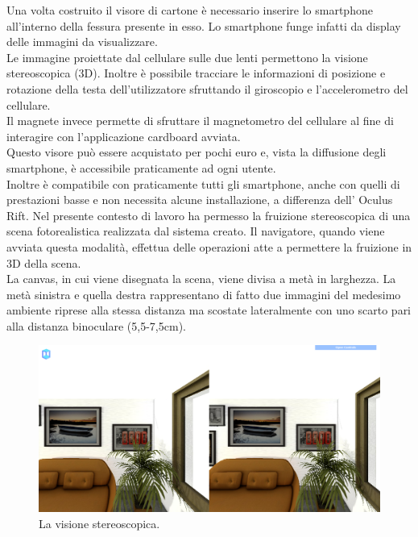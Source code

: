 Una volta costruito il visore di cartone è necessario inserire lo smartphone all’interno della fessura presente in esso. Lo smartphone funge infatti da display delle immagini da visualizzare.
\\
Le immagine proiettate dal cellulare sulle due lenti permettono la visione stereoscopica (3D).
Inoltre è possibile tracciare le informazioni di posizione e rotazione della testa dell’utilizzatore sfruttando il giroscopio e l’accelerometro del cellulare. 
\\
Il magnete invece permette di sfruttare il magnetometro del cellulare al fine di interagire con l’applicazione cardboard avviata.
\\
Questo visore può essere acquistato per pochi euro e, vista la diffusione degli smartphone, è accessibile praticamente ad ogni utente. 
\\
Inoltre è compatibile con praticamente tutti gli smartphone, anche con quelli di prestazioni basse e non necessita alcune installazione, a differenza dell’ Oculus Rift.
Nel presente contesto di lavoro ha permesso la fruizione stereoscopica di una scena fotorealistica realizzata dal sistema creato.
Il navigatore, quando viene avviata questa modalità, effettua delle operazioni atte a permettere la fruizione in 3D della scena. 
\\
La canvas, in cui viene disegnata la scena, viene divisa a metà in larghezza. La metà sinistra e  quella destra rappresentano di fatto due immagini del medesimo ambiente riprese alla stessa distanza ma scostate lateralmente con uno scarto pari alla distanza binoculare (5,5-7,5cm).
\begin{figure}[htb]
 \centering
 \includegraphics[width=1\linewidth]{images/chapter_navigazione_scena/immag_virt.png}\hfill
 \caption[Visione stereoscopica.]{La visione stereoscopica.}
 \label{fig:navigazione_scena_navigator_immag_virt}
\end{figure}
